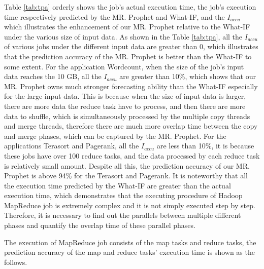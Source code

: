 Table \ref{tab:tpa} orderly shows the job's actual execution time, the job's execution time respectively predicted by the MR. Prophet and What-IF, and the $I_{accu}$ which illustrates the enhancement of our MR. Prophet relative to the What-IF under the various size of input data. As shown in the Table \ref{tab:tpa}, all the $I_{accu}$ of various jobs under the different input data  are greater than 0, which illustrates that the prediction accuracy of the MR. Prophet is better than the What-IF to some extent. For the application Wordcount, when the size of the job's input data reaches the 10 GB, all the $I_{accu}$ are greater than 10\%, which shows that our MR. Prophet owns much stronger forecasting ability than the What-IF especially for the large input data. This is because when the size of input data is larger, there are more data the reduce task have to process, and then there are more data to shuffle, which is simultaneously processed by the multiple copy threads and merge threads, therefore there are much more overlap time between the copy and merge phases, which can be captured by the MR. Prophet. For the applications Terasort and Pagerank, all the $I_{accu}$ are less than 10\%, it is because these jobs have over 100 reduce tasks, and the data processed by each reduce task is relatively small amount. Despite all this, the prediction accuracy of our MR. Prophet is above 94\% for the Terasort and Pagerank. It is noteworthy that all the execution time predicted by the What-IF are greater than the actual execution time, which demonstrates that the executing procedure of Hadoop MapReduce job is extremely complex and it is not simply executed step by step. Therefore, it is necessary to find out the parallels between multiple different phases and quantify the overlap time of these parallel phases.

The execution of MapReduce job consists of the map tasks and reduce tasks, the prediction accuracy of the map and reduce tasks' execution time is shown as the follows.

